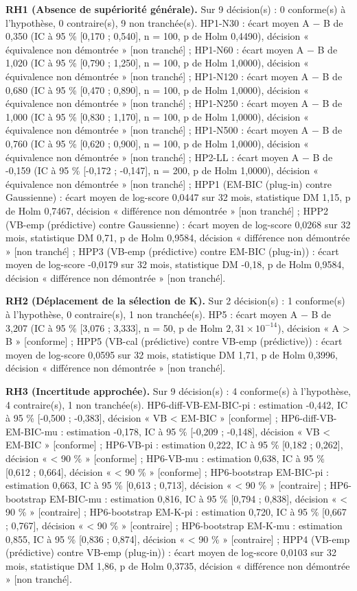 \textbf{RH1 (Absence de supériorité générale).} Sur 9 décision(s) : 0 conforme(s) à l'hypothèse, 0 contraire(s), 9 non tranchée(s). HP1-N30 : écart moyen A $-$ B de 0,350 (IC à 95 \% [0,170 ; 0,540], n = 100, p de Holm 0,4490), décision « équivalence non démontrée » [non tranché] ; HP1-N60 : écart moyen A $-$ B de 1,020 (IC à 95 \% [0,790 ; 1,250], n = 100, p de Holm 1,0000), décision « équivalence non démontrée » [non tranché] ; HP1-N120 : écart moyen A $-$ B de 0,680 (IC à 95 \% [0,470 ; 0,890], n = 100, p de Holm 1,0000), décision « équivalence non démontrée » [non tranché] ; HP1-N250 : écart moyen A $-$ B de 1,000 (IC à 95 \% [0,830 ; 1,170], n = 100, p de Holm 1,0000), décision « équivalence non démontrée » [non tranché] ; HP1-N500 : écart moyen A $-$ B de 0,760 (IC à 95 \% [0,620 ; 0,900], n = 100, p de Holm 1,0000), décision « équivalence non démontrée » [non tranché] ; HP2-LL : écart moyen A $-$ B de -0,159 (IC à 95 \% [-0,172 ; -0,147], n = 200, p de Holm 1,0000), décision « équivalence non démontrée » [non tranché] ; HPP1 (EM-BIC (plug-in) contre Gaussienne) : écart moyen de log-score 0,0447 sur 32 mois, statistique DM 1,15, p de Holm 0,7467, décision « différence non démontrée » [non tranché] ; HPP2 (VB-emp (prédictive) contre Gaussienne) : écart moyen de log-score 0,0268 sur 32 mois, statistique DM 0,71, p de Holm 0,9584, décision « différence non démontrée » [non tranché] ; HPP3 (VB-emp (prédictive) contre EM-BIC (plug-in)) : écart moyen de log-score -0,0179 sur 32 mois, statistique DM -0,18, p de Holm 0,9584, décision « différence non démontrée » [non tranché].

\textbf{RH2 (Déplacement de la sélection de K).} Sur 2 décision(s) : 1 conforme(s) à l'hypothèse, 0 contraire(s), 1 non tranchée(s). HP5 : écart moyen A $-$ B de 3,207 (IC à 95 \% [3,076 ; 3,333], n = 50, p de Holm $2{,}31 \times 10^{-14}$), décision « A > B » [conforme] ; HPP5 (VB-cal (prédictive) contre VB-emp (prédictive)) : écart moyen de log-score 0,0595 sur 32 mois, statistique DM 1,71, p de Holm 0,3996, décision « différence non démontrée » [non tranché].

\textbf{RH3 (Incertitude approchée).} Sur 9 décision(s) : 4 conforme(s) à l'hypothèse, 4 contraire(s), 1 non tranchée(s). HP6-diff-VB-EM-BIC-pi : estimation -0,442, IC à 95 \% [-0,500 ; -0,383], décision « VB < EM-BIC » [conforme] ; HP6-diff-VB-EM-BIC-mu : estimation -0,178, IC à 95 \% [-0,209 ; -0,148], décision « VB < EM-BIC » [conforme] ; HP6-VB-pi : estimation 0,222, IC à 95 \% [0,182 ; 0,262], décision « < 90 \% » [conforme] ; HP6-VB-mu : estimation 0,638, IC à 95 \% [0,612 ; 0,664], décision « < 90 \% » [conforme] ; HP6-bootstrap EM-BIC-pi : estimation 0,663, IC à 95 \% [0,613 ; 0,713], décision « < 90 \% » [contraire] ; HP6-bootstrap EM-BIC-mu : estimation 0,816, IC à 95 \% [0,794 ; 0,838], décision « < 90 \% » [contraire] ; HP6-bootstrap EM-K-pi : estimation 0,720, IC à 95 \% [0,667 ; 0,767], décision « < 90 \% » [contraire] ; HP6-bootstrap EM-K-mu : estimation 0,855, IC à 95 \% [0,836 ; 0,874], décision « < 90 \% » [contraire] ; HPP4 (VB-emp (prédictive) contre VB-emp (plug-in)) : écart moyen de log-score 0,0103 sur 32 mois, statistique DM 1,86, p de Holm 0,3735, décision « différence non démontrée » [non tranché].

